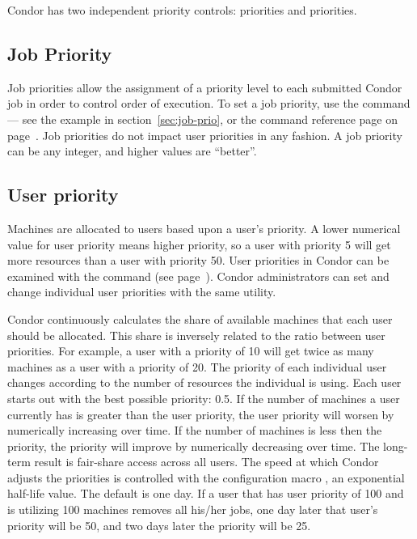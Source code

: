 Condor has two independent priority controls: 
priorities and  priorities.  

\subsection{Job Priority}

Job priorities allow the assignment of a priority level to
each submitted Condor job in order to
control order of execution.
To set a job priority, use the  command
--- see the example in section~\ref{sec:job-prio}, or the
command reference page on page~\pageref{man-condor-prio}.
Job priorities do not impact user priorities in any fashion.
A job priority can be any integer, and higher values are ``better''.

\subsection{\label{sec:user-priority-explained}User priority}

Machines are allocated to users based upon a user's priority.
A lower numerical value for user priority means higher priority,
so a user with priority 5 will get more resources than
a user with priority 50.
User priorities in Condor can be examined with the 
command (see page~\pageref{man-condor-userprio}).
Condor administrators can set and change individual user priorities
with the same utility.

Condor continuously calculates the share of available machines that each
user should be allocated.    This share is inversely related to the ratio
between user priorities.
For example, a user with a priority of 10 will get twice as many
machines as a user with a priority of 20.
The priority of each individual user changes according to
the number of resources the individual is using.
Each user starts out with the best possible priority: 0.5.
If the number of machines a user currently has is greater than 
the user priority,
the user priority will worsen by numerically increasing over time.
If the number of machines is less then the priority,
the priority will improve by numerically decreasing over time. 
The long-term result is fair-share access across all users.
The speed at which Condor adjusts the priorities is
controlled with the configuration macro ,
an exponential half-life value.
The default is one day.
If a user that has user priority of 100 and is
utilizing 100 machines removes all his/her jobs,
one day later that user's
priority will be 50, and two days later the priority will be 25.

